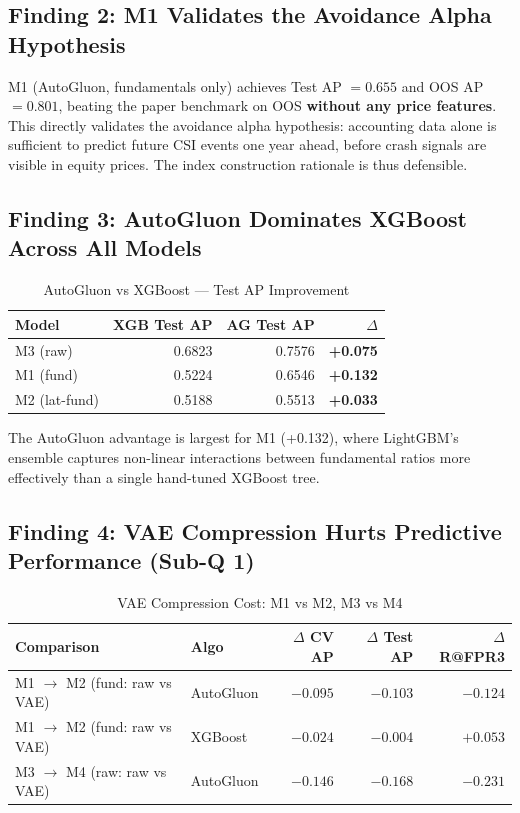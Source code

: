 \documentclass{report}\usepackage[]{graphicx}\usepackage[table]{xcolor}
\begin{document}
\subsection{Finding 2: M1 Validates the Avoidance Alpha Hypothesis}

M1 (AutoGluon, fundamentals only) achieves Test AP $= 0.655$ and OOS AP $= 0.801$, 
beating the paper benchmark on OOS \textbf{without any price features}. 
This directly validates the avoidance alpha hypothesis: accounting data alone 
is sufficient to predict future CSI events one year ahead, before crash signals 
are visible in equity prices. The index construction rationale is thus defensible.

\subsection{Finding 3: AutoGluon Dominates XGBoost Across All Models}

\begin{table}[H]
\centering
\caption{AutoGluon vs XGBoost — Test AP Improvement}
\begin{tabular}{lrrr}
\toprule
\textbf{Model} & \textbf{XGB Test AP} & \textbf{AG Test AP} & \textbf{$\Delta$} \\
\midrule
M3 (raw)       & 0.6823 & 0.7576 & \textbf{+0.075} \\
M1 (fund)      & 0.5224 & 0.6546 & \textbf{+0.132} \\
M2 (lat-fund)  & 0.5188 & 0.5513 & \textbf{+0.033} \\
\bottomrule
\end{tabular}
\end{table}

\noindent The AutoGluon advantage is largest for M1 (+0.132), where LightGBM's 
ensemble captures non-linear interactions between fundamental ratios more 
effectively than a single hand-tuned XGBoost tree.

\subsection{Finding 4: VAE Compression Hurts Predictive Performance (Sub-Q 1)}

\begin{table}[H]
\centering
\caption{VAE Compression Cost: M1 vs M2, M3 vs M4}
\begin{tabular}{llrrr}
\toprule
\textbf{Comparison} & \textbf{Algo} & \textbf{$\Delta$ CV AP} & \textbf{$\Delta$ Test AP} & \textbf{$\Delta$ R@FPR3} \\
\midrule
M1 $\rightarrow$ M2 (fund: raw vs VAE) & AutoGluon & $-0.095$ & $-0.103$ & $-0.124$ \\
M1 $\rightarrow$ M2 (fund: raw vs VAE) & XGBoost   & $-0.024$ & $-0.004$ & $+0.053$ \\
M3 $\rightarrow$ M4 (raw: raw vs VAE)  & AutoGluon & $-0.146$ & $-0.168$ & $-0.231$ \\
\bottomrule
\end{tabular}
\end{table}
\end{document}
